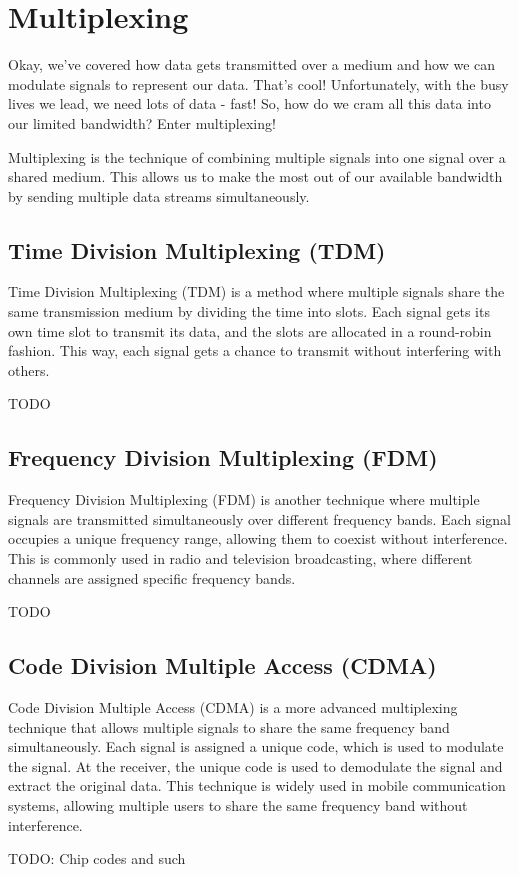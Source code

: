 \section{Multiplexing}
\label{sec:multiplexing}
Okay, we've covered how data gets transmitted over a medium and how we can modulate signals to represent our data. That's cool! Unfortunately, with the busy lives we lead, we need lots of data - fast! So, how do we cram all this data into our limited bandwidth? Enter multiplexing!

Multiplexing is the technique of combining multiple signals into one signal over a shared medium. This allows us to make the most out of our available bandwidth by sending multiple data streams simultaneously.

\subsection{Time Division Multiplexing (TDM)}
\label{subsec:tdm}
Time Division Multiplexing (TDM) is a method where multiple signals share the same transmission medium by dividing the time into slots. Each signal gets its own time slot to transmit its data, and the slots are allocated in a round-robin fashion. This way, each signal gets a chance to transmit without interfering with others.

TODO

\subsection{Frequency Division Multiplexing (FDM)}
\label{subsec:fdm}
Frequency Division Multiplexing (FDM) is another technique where multiple signals are transmitted simultaneously over different frequency bands. Each signal occupies a unique frequency range, allowing them to coexist without interference. This
is commonly used in radio and television broadcasting, where different channels are assigned specific frequency bands.


TODO

\subsection{Code Division Multiple Access (CDMA)}
\label{subsec:cdma}
Code Division Multiple Access (CDMA) is a more advanced multiplexing technique that allows multiple signals to share the same frequency band simultaneously. Each signal is assigned a unique code, which is used to modulate the signal. At the receiver, the unique code is used to demodulate the signal and extract the original data. This technique is widely used in mobile communication systems, allowing multiple users to share the same frequency band without interference.

TODO: Chip codes and such
